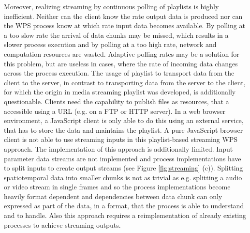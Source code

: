 	Moreover, realizing streaming by continuous polling of playlists is highly inefficient. Neither can the client know the rate output data is produced nor can the \ac{WPS} process know at which rate input data becomes available. By polling at a too slow rate the arrival of data chunks may be missed, which results in a slower process execution and by polling at a too high rate, network and computation resources are wasted. Adaptive polling rates may be a solution for this problem, but are useless in cases, where the rate of incoming data changes across the process execution. The usage of playlist to transport data from the client to the server, in contrast to transporting data from the server to the client, for which the origin in media streaming playlist was developed, is additionally questionable. Clients need the capability to publish files as resources, that a accessible using a URL (e.g. on a FTP or HTTP server). In a web browser environment, a JavaScript client is only able to do this using an external service, that has to store the data and maintains the playlist. A pure JavaScript browser client is not able to use streaming inputs in this playlist-based streaming \ac{WPS} approach. The implementation of this approach is additionally limited. Input parameter data streams are not implemented and process implementations have to split inputs to create output streams (see Figure \ref{fig:streaming} (c)). Splitting spatiotemporal data into smaller chunks is not as trivial as e.g. splitting a audio or video stream in single frames and so the process implementations become heavily format dependent and dependencies between data chunk can only expressed as part of the data, in a format, that the process is able to understand and to handle. Also this approach requires a reimplementation of already existing processes to achieve streaming outputs.

